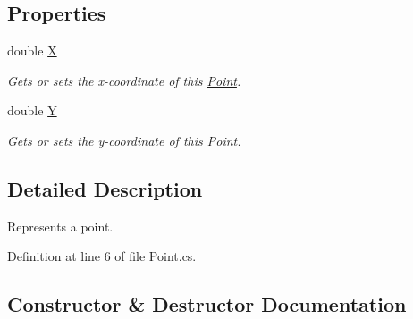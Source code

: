 \subsection*{Properties}
\begin{DoxyCompactItemize}
\item 
double \mbox{\hyperlink{class_test_project_1_1_task_library_1_1_tasks_1_1_lesson1_1_1_models_1_1_point_a1863bc017fd8d4ee1d3383e710a54830}{X}}
\begin{DoxyCompactList}\small\item\em Gets or sets the x-\/coordinate of this \mbox{\hyperlink{class_test_project_1_1_task_library_1_1_tasks_1_1_lesson1_1_1_models_1_1_point}{Point}}. \end{DoxyCompactList}\item 
double \mbox{\hyperlink{class_test_project_1_1_task_library_1_1_tasks_1_1_lesson1_1_1_models_1_1_point_a51ebde555adf9b621b2a171ac19d3158}{Y}}
\begin{DoxyCompactList}\small\item\em Gets or sets the y-\/coordinate of this \mbox{\hyperlink{class_test_project_1_1_task_library_1_1_tasks_1_1_lesson1_1_1_models_1_1_point}{Point}}. \end{DoxyCompactList}\end{DoxyCompactItemize}


\subsection{Detailed Description}
Represents a point. 



Definition at line 6 of file Point.\+cs.



\subsection{Constructor \& Destructor Documentation}
\mbox{\label{class_test_project_1_1_task_library_1_1_tasks_1_1_lesson1_1_1_models_1_1_point_a21348a8e6df00a7997ae750cd3febffc}} 
